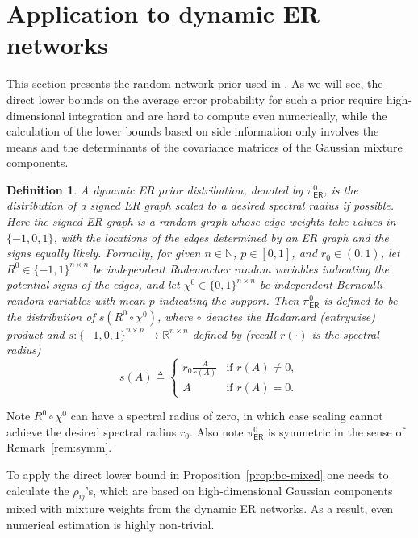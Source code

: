 \documentclass[conference,letterpaper]{IEEEtran}
\newcommand{\defeq}{\triangleq}
\newcommand{\reals}{\mathbb{R}}%
\newtheorem{definition}{Definition}
\newcommand{\erPrior}{\pi^0_{\mathsf{ER}}}%
\newcommand{\specRad}{r}%
\newcommand{\trueSuppMat}{\chi^0}%
\begin{document}
\section{Application to dynamic ER networks}
\label{sec:er-app}
This section presents the random network prior used in
\cite{SunTaylorBollt15}.  As we will see, the direct lower bounds on
the average error probability for such a prior require
high-dimensional integration and are hard to compute even numerically,
while the calculation of the lower bounds based on side information
only involves the means and the determinants of the covariance
matrices of the Gaussian mixture components.
\begin{definition}
  \label{def:er}
  A \emph{dynamic ER prior distribution}, denoted by $\erPrior$, is
  the distribution of a signed ER graph scaled to a desired spectral
  radius if possible.  Here the signed ER graph is a random graph
  whose edge weights take values in $\{-1, 0, 1\}$, with the locations
  of the edges determined by an ER graph and the signs equally likely.
  Formally, for given $n\in\mathbb N$, $p\in[0, 1]$, and
  $r_0\in(0, 1)$, let $R^0\in\{-1, 1\}^{n\times n}$ be independent
  Rademacher random variables indicating the potential signs of the
  edges, and let $\trueSuppMat\in\{0, 1\}^{n\times n}$ be independent
  Bernoulli random variables with mean $p$ indicating the support.
  Then $\erPrior$ is defined to be the distribution of
  $s(R^0\circ \trueSuppMat)$, where $\circ$ denotes the Hadamard
  (entrywise) product and
  $s\colon\{-1, 0, 1\}^{n\times n}\to\reals^{n\times n}$ defined by
  (recall $r(\cdot)$ is the spectral radius)
  \[s(A) \defeq
    \begin{cases}
      r_0\frac{A}{\specRad(A)} & \text{if }\specRad(A) \neq 0,\\
      A & \text{if }\specRad(A) = 0.
    \end{cases}
  \]
\end{definition}
Note $R^0\circ\trueSuppMat$ can have a spectral radius of zero, in
which case scaling cannot achieve the desired spectral radius $r_0$.
Also note $\erPrior$ is symmetric in the sense of
Remark~\ref{rem:symm}.

To apply the direct lower bound in Proposition~\ref{prop:bc-mixed} one
needs to calculate the $\rho_{ij}$'s, which are based on
high-dimensional Gaussian components mixed with mixture weights from
the dynamic ER networks.  As a result, even numerical estimation is
highly non-trivial.
\end{document}

